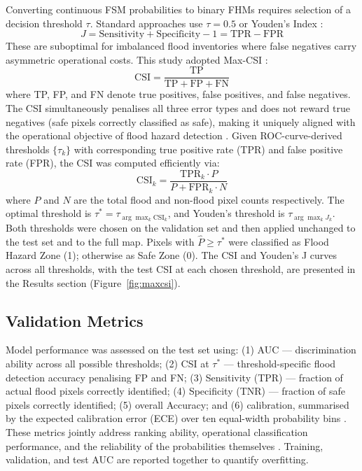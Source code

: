 \documentclass[12pt, a4paper]{article}
\begin{document}
Converting continuous FSM probabilities to binary FHMs requires selection of a decision threshold $\tau$. Standard approaches use $\tau = 0.5$ or Youden's Index \citep{youden1950}:
\begin{equation}
    J = \text{Sensitivity} + \text{Specificity} - 1 = \text{TPR} - \text{FPR}
\end{equation}
These are suboptimal for imbalanced flood inventories where false negatives carry asymmetric operational costs. This study adopted Max-CSI \citep{schaefer1990, wilks2019}:
\begin{equation}
    \text{CSI} = \frac{\text{TP}}{\text{TP} + \text{FP} + \text{FN}}
\end{equation}
where TP, FP, and FN denote true positives, false positives, and false negatives. The CSI simultaneously penalises all three error types and does not reward true negatives (safe pixels correctly classified as safe), making it uniquely aligned with the operational objective of flood hazard detection \citep{mason2003, Pham2021}. Given ROC-curve-derived thresholds $\{\tau_k\}$ with corresponding true positive rate (TPR) and false positive rate (FPR), the CSI was computed efficiently via:
\begin{equation}
    \text{CSI}_k = \frac{\text{TPR}_k \cdot P}{P + \text{FPR}_k \cdot N}
\end{equation}
where $P$ and $N$ are the total flood and non-flood pixel counts respectively. The optimal threshold is $\tau^* = \tau_{\arg\max_k \text{CSI}_k}$, and Youden's threshold is $\tau_{\arg\max_k J_k}$. Both thresholds were chosen on the validation set and then applied unchanged to the test set and to the full map. Pixels with $\hat{P} \geq \tau^*$ were classified as Flood Hazard Zone (1); otherwise as Safe Zone (0). The CSI and Youden's J curves across all thresholds, with the test CSI at each chosen threshold, are presented in the Results section (Figure~\ref{fig:maxcsi}).

\subsection{Validation Metrics}

Model performance was assessed on the test set using: (1) AUC --- discrimination ability across all possible thresholds; (2) CSI at $\tau^*$ --- threshold-specific flood detection accuracy penalising FP and FN; (3) Sensitivity (TPR) --- fraction of actual flood pixels correctly identified; (4) Specificity (TNR) --- fraction of safe pixels correctly identified; (5) overall Accuracy; and (6) calibration, summarised by the expected calibration error (ECE) over ten equal-width probability bins \citep{Niculescu-Mizil2005}. These metrics jointly address ranking ability, operational classification performance, and the reliability of the probabilities themselves \citep{Fawcett2006, Powers2011}. Training, validation, and test AUC are reported together to quantify overfitting.
\end{document}
